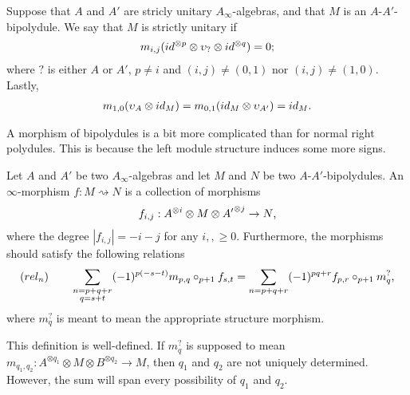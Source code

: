 \documentclass[../thesis.tex]{subfiles}
\begin{document}
            \begin{definition}
                Suppose that $A$ and $A'$ are stricly unitary $A_\infty$-algebras, and that $M$ is an $A$-$A'$-bipolydule. We say that $M$ is strictly unitary if
                \begin{align*}
                    m_{i,j}(id^{\otimes p} \otimes \upsilon_? \otimes id^{\otimes q}) = 0\tt{;}
                \end{align*}
                where $?$ is either $A$ or $A'$, $p \neq i$ and $(i,j) \neq (0,1)$ nor $(i,j) \neq (1,0)$. Lastly,
                \begin{align*}
                    m_{1,0}(\upsilon_A \otimes id_M) = m_{0,1}(id_M \otimes \upsilon_{A'}) = id_M\tt{.}
                \end{align*}
            \end{definition}

            A morphism of bipolydules is a bit more complicated than for normal right polydules. This is because the left module structure induces some more signs.
            
            \begin{definition}
                Let $A$ and $A'$ be two $A_\infty$-algebras and let $M$ and $N$ be two $A$-$A'$-bipolydules. An $\infty$-morphism $f : M \rightsquigarrow N$ is a collection of morphisms
                \begin{align*}
                    f_{i,j} : A^{\otimes i} \otimes M \otimes {A'}^{\otimes j} \rightarrow N\tt{,}
                \end{align*}
                where the degree $|f_{i,j}| = -i-j$ for any $i,, \geq 0$. Furthermore, the morphisms should satisfy the following relations
                \begin{align*}
                    (rel_n)\qquad \sum_{\substack{n = p + q + r \\ q = s + t}}(-1)^{p(-s-t)}m_{p,q}\circ_{p+1}f_{s,t} = \sum_{n = p + q + r}(-1)^{pq + r}f_{p,r} \circ_{p+1} m^?_q\tt{,}
                \end{align*}
                where $m^?_q$ is meant to mean the appropriate structure morphism.
            \end{definition}

            This definition is well-defined. If $m^?_q$ is supposed to mean $m_{q_1,q_2} : A^{\otimes q_1} \otimes M \otimes B^{\otimes q_2} \rightarrow M$, then $q_1$ and $q_2$ are not uniquely determined. However, the sum will span every possibility of $q_1$ and $q_2$.
\end{document}
